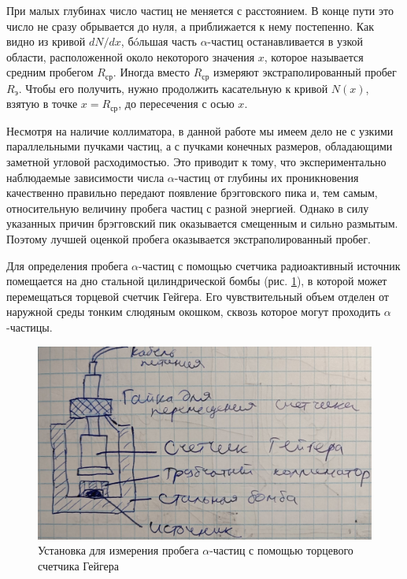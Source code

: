 	При малых глубинах число частиц не меняется с расстоянием. В конце пути это число не сразу обрывается до нуля, а приближается к нему постепенно. Как видно из кривой $dN/dx$, бóльшая часть $\alpha$-частиц останавливается в узкой области, расположенной около некоторого значения $x$, которое называется средним пробегом $R_\text{ср}$. Иногда вместо $R_\text{ср}$ измеряют экстраполированный пробег $R_\text{э}$. Чтобы его получить, нужно продолжить касательную к кривой $N(x)$, взятую в точке $x = R_\text{ср}$, до пересечения с осью $x$.
	
	Несмотря на наличие коллиматора, в данной работе мы имеем дело не с узкими параллельными пучками частиц, а с пучками конечных размеров, обладающими заметной угловой расходимостью. Это приводит к тому, что экспериментально наблюдаемые зависимости числа $\alpha$-частиц от глубины их проникновения качественно правильно передают появление брэгговского пика и, тем самым, относительную величину пробега частиц с разной энергией. Однако в силу указанных причин брэгговский пик оказывается смещенным и сильно размытым. Поэтому лучшей оценкой пробега оказывается экстраполированный пробег.

	
	
	
	Для определения пробега $\alpha$-частиц с помощью счетчика радиоактивный источник помещается на дно стальной цилиндрической бомбы (рис. \ref{AlphaParticles_Geiger}), в которой может перемещаться торцевой счетчик Гейгера. Его чувствительный объем отделен от наружной среды тонким слюдяным окошком, сквозь которое могут проходить $\alpha$-частицы. 
	
	\begin{figure}[h!]
		\centering
		\includegraphics[width=\linewidth]{Pictures/Geiger}
		\caption{Установка для измерения пробега $\alpha$-частиц с помощью торцевого счетчика Гейгера}
		\label{AlphaParticles_Geiger}
	\end{figure}

